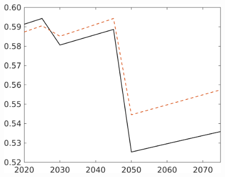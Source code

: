 \begin{figure}[h!!]
\begin{minipage}[]{0.32\textwidth}
\end{minipage}
\begin{minipage}[]{0.32\textwidth}
	\includegraphics[width=1\textwidth]{../../codding_model/own_basedOnFried/optimalPol_elastS_DisuSci/figures/all_1705/comp_notaul_OPT_T_NoTaus_N_spillover0_sep1_BN0_ineq0_etaa0.79.png}
\end{minipage}
\end{figure} 
